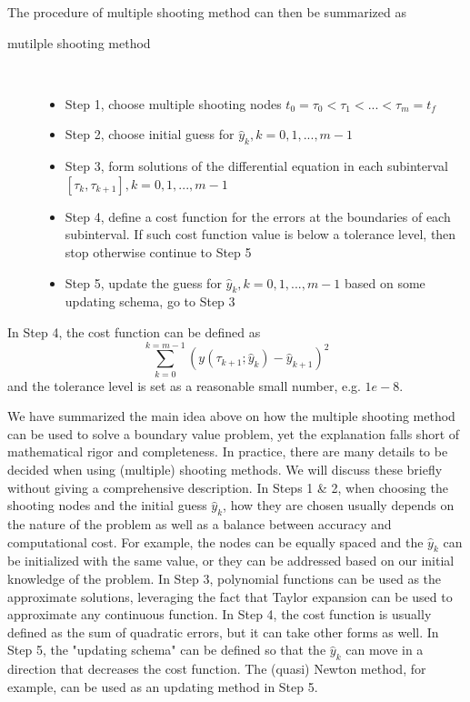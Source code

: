 \documentclass  [
  paper    = a4,
  BCOR     = 10mm,
  twoside,
  fontsize = 12pt,
  fleqn,
  toc      = bibnumbered,
  toc      = listofnumbered,
  numbers  = noendperiod,
  headings = normal,
  listof   = leveldown,
  version  = 3.03
]                                       {scrreprt}
\newcommand{\<}{\langle}
\renewcommand{\>}{\rangle}
\begin{document}
The procedure of multiple shooting method can then be summarized as
\begin{description}
	\item[mutilple shooting method] \
	\begin{itemize}
		\item Step 1, choose multiple shooting nodes $t_0 = \tau_0 < \tau_1 < ... < \tau_m = t_f$ 
		\item Step 2, choose initial guess for $\hat{y}_k, k = 0, 1, ..., m-1$ 
		\item Step 3, form solutions of the differential equation in each subinterval $[\tau_k, \tau_{k+1}], k = 0, 1, ..., m-1$
		\item Step 4, define a cost function for the errors at the boundaries of each subinterval. If such cost function value is below a tolerance level, then stop otherwise continue to Step 5
		\item Step 5, update the guess for $\hat{y}_k, k = 0, 1, ..., m-1$ based on some updating schema, go to Step 3
	\end{itemize}
\end{description}
In Step 4, the cost function can be defined as 
\begin{equation}
	\sum_{k=0}^{k=m-1}(y(\tau_{k+1}; \hat{y}_k) - \hat{y}_{k+1})^2
\end{equation}
and the tolerance level is set as a reasonable small number, e.g. $1e-8$.

We have summarized the main idea above on how the multiple shooting method can be used to solve a boundary value problem, yet the explanation falls short of mathematical rigor and completeness. In practice, there are many details to be decided when using (multiple) shooting methods. We will discuss these briefly without giving a comprehensive description. In Steps 1 \& 2, when choosing the shooting nodes and the initial guess $\hat{y}_k$, how they are chosen usually depends on the nature of the problem as well as a balance between accuracy and computational cost. For example, the nodes can be equally spaced and the $\hat{y}_k$ can be initialized with the same value, or they can be addressed based on our initial knowledge of the problem. In Step 3, polynomial functions can be used as the approximate solutions, leveraging the fact that Taylor expansion can be used to approximate any continuous function. In Step 4, the cost function is usually defined as the sum of quadratic errors, but it can take other forms as well. In Step 5, the "updating schema" can be defined so that the $\hat{y}_k$ can move in a direction that decreases the cost function. The (quasi) Newton method, for example, can be used as an updating method in Step 5.
\end{document}

